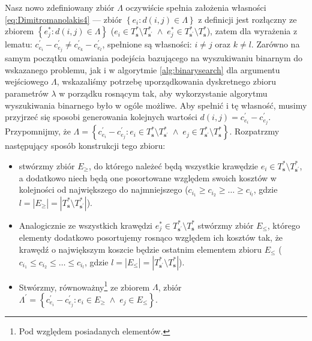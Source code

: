 Nasz nowo zdefiniowany zbiór $\Lambda$ oczywiście spełnia założenia własności \ref{eq:Dimitromanolakis4} --- zbiór $\left\{ e_{i} : d \left( i, j \right) \in \Lambda \right\}$ z definicji jest rozłączny ze zbiorem $\left\{ e^{\ast}_{j} : d \left( i, j \right) \in \Lambda \right\}$ ($e_{i} \in T^{\ast}_{\textbf{s}} \setminus T^{\ast}_{\textbf{s}^{\prime}} \; \wedge \; e^{\ast}_{j} \in T^{\ast}_{\textbf{s}^{\prime}} \setminus T^{\ast}_{\textbf{s}}$), zatem dla wyrażenia z lematu: $c^{\prime}_{e_{i}} - c^{\prime}_{e_{j}} \neq c^{\prime}_{e_{k}} - c^{\prime}_{e_{l}}$, spełnione są własności: $i \neq j$ oraz $k \neq l$. Zarówno na samym początku omawiania podejścia bazującego na wyszukiwaniu binarnym do wskazanego problemu, jak i w algorytmie \ref{alg:binarysearch} dla argumentu wejściowego $\Lambda$, wskazaliśmy potrzebę uporządkowania dyskretnego zbioru parametrów $\lambda$ w porządku rosnącym tak, aby wykorzystanie algorytmu wyszukiwania binarnego było w ogóle możliwe. Aby spełnić i tę własność, musimy przyjrzeć się sposobi generowania kolejnych wartości $d \left( i, j \right) = c^{\prime}_{e_{i}} - c^{\prime}_{e_{j}}$. Przypomnijmy, że $\Lambda = \left\{ c^{\prime}_{e_{i}} - c^{\prime}_{e_{j}} : e_{i} \in T^{\ast}_{\textbf{s}} \setminus T^{\ast}_{\textbf{s}^{\prime}} \; \wedge \; e_{j} \in T^{\ast}_{\textbf{s}^{\prime}} \setminus T^{\ast}_{\textbf{s}} \right\}$. Rozpatrzmy następujący sposób konstrukcji tego zbioru:

\begin{itemize}
	\item stwórzmy zbiór $E_{\geqslant}$, do którego należeć będą wszystkie krawędzie $e_{i} \in T^{\ast}_{\textbf{s}} \setminus T^{\ast}_{\textbf{s}^{\prime}}$, a dodatkowo niech będą one posortowane względem swoich kosztów w kolejności od największego do najmniejszego ($c_{i_{1}} \geqslant c_{i_{2}} \geqslant \dots \geqslant c_{i_{l}}$, gdzie $l = \left| E_{\geqslant} \right| = \left| T^{\ast}_{\textbf{s}} \setminus T^{\ast}_{\textbf{s}^{\prime}} \right|$).
	\item Analogicznie ze wszystkich krawędzi $e^{\ast}_{j} \in T^{\ast}_{\textbf{s}^{\prime}} \setminus  T^{\ast}_{\textbf{s}}$ stwórzmy zbiór $E_{\leqslant}$, którego elementy dodatkowo posortujemy rosnąco względem ich kosztów tak, że krawędź o największym koszcie będzie ostatnim elementem zbioru $E_{\leqslant}$ ($c_{i_{1}} \leqslant c_{i_{2}} \leqslant \dots \leqslant c_{i_{l}}$, gdzie $l = \left| E_{\leqslant} \right| = \left| T^{\ast}_{\textbf{s}^{\prime}} \setminus  T^{\ast}_{\textbf{s}} \right|$).
	\item Stwórzmy, równoważny\footnote{Pod względem posiadanych elementów.} ze zbiorem $\Lambda$, zbiór $\Lambda^{\prime} = \left\{ c^{\prime}_{e_{i}} - c^{\prime}_{e_{j}} : e_{i} \in E_{\geqslant} \; \wedge \; e_{j} \in E_{\leqslant} \right\}$.
\end{itemize}

